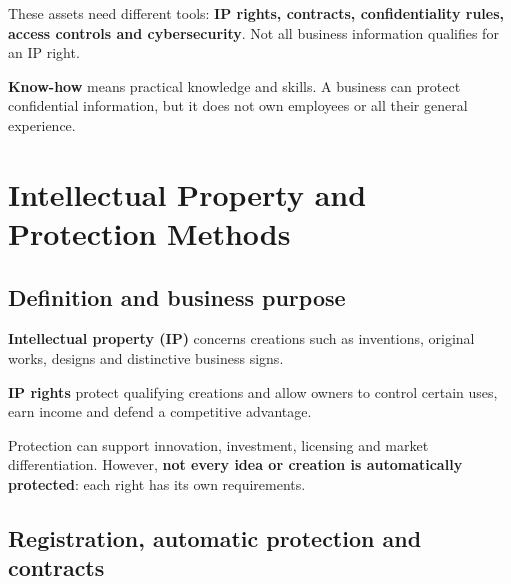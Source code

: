 \documentclass[12pt,a4paper]{report}
\begin{document}
These assets need different tools: \textbf{IP rights, contracts, confidentiality rules, access controls and cybersecurity}. Not all business information qualifies for an IP right.

\textbf{Know-how} means practical knowledge and skills. A business can protect confidential information, but it does not own employees or all their general experience.

\hypertarget{intellectual-property-and-protection-methods}{%
\section{Intellectual Property and Protection Methods}\label{intellectual-property-and-protection-methods}}

\hypertarget{definition-and-business-purpose}{%
\subsection{Definition and business purpose}\label{definition-and-business-purpose}}

\textbf{Intellectual property (IP)} concerns creations such as inventions, original works, designs and distinctive business signs.

\textbf{IP rights} protect qualifying creations and allow owners to control certain uses, earn income and defend a competitive advantage.

Protection can support innovation, investment, licensing and market differentiation. However, \textbf{not every idea or creation is automatically protected}: each right has its own requirements.

\hypertarget{registration-automatic-protection-and-contracts}{%
\subsection{Registration, automatic protection and contracts}\label{registration-automatic-protection-and-contracts}}
\end{document}
